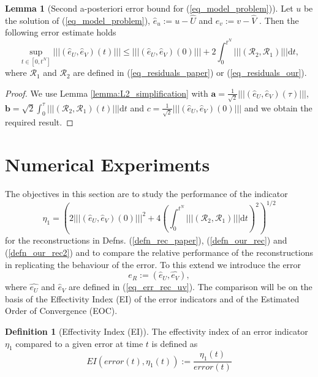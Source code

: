 \documentclass[12pt,a4paper]{article}
\numberwithin{equation}{section}
\theoremstyle{definition}
\newcommand{\pnorm}[1]{\left|\left|\left|#1\right|\right|\right|}
\newcommand{\vect}[1]{\textbf{#1}}
\newcommand{\qp}[1]{\left(#1\right)}
\newcommand{\qb}[1]{\left[#1\right]}
\newcommand{\rec}[1]{\widehat{{#1}}}
\newtheorem{Defn}[subsection]{Definition}
\newtheorem{Lemma}[subsection]{Lemma}
\begin{document}
\begin{Lemma}[Second a-posteriori error bound for (\ref{eq_model_problem})]
	Let $u$ be the solution of (\ref{eq_model_problem}), $\hat{e}_u:=u-\rec{U}$ and $\hat{e}_v:=v-\rec{V}$ .  Then the following error estimate holds
	\begin{equation}\label{eq_bound_2}
	\sup_{t\in\qb{0,t^N}}\pnorm{\qp{\hat{e}_U,\hat{e}_V}\qp{t}}\leq
	\pnorm{\qp{\hat{e}_U,\hat{e}_V}\qp{0}}+
	2{\int_0^{t^N}\pnorm{\qp{\mathcal{R}_2,\mathcal{R}_1}}\mathrm{d}t},
	\end{equation}
	where $\mathcal{R}_1$ and $\mathcal{R}_2$ are defined in (\ref{eq_residuals_paper}) or (\ref{eq_residuals_our}).
\end{Lemma}
\begin{proof}
We use  Lemma  \ref{lemma:L2_simplification} with $\vect{a}=\frac{1}{\sqrt{2}}\pnorm{\qp{\hat{e}_U, \hat{e}_V}\qp{\tau}}$, $\vect{b}=\sqrt{2}\int_0^\tau\pnorm{\qp{\mathcal{R}_2,\mathcal{R}_1}\qp{t}} \mathrm{d}t$ and $c = \frac{1}{\sqrt{2}}\pnorm{\qp{\hat{e}_U, \hat{e}_V}\qp{0}}$ and we obtain the required result.
\end{proof}



\section{Numerical Experiments}\label{sec_num_exp}
The objectives in this section are to study the performance of the indicator 
\begin{equation}\label{eq_bound_test}
\eta_1=\qp{2\pnorm{\qp{\hat{e}_U,\hat{e}_V}\qp{0}}^2+
	4\qp{\int_0^{t^N}\pnorm{\qp{\mathcal{R}_2,\mathcal{R}_1}}\mathrm{d}t}^2}^{1/2}
\end{equation}
for the reconstructions in Defns. (\ref{defn_rec_paper}), (\ref{defn_our_rec}) and (\ref{defn_our_rec2}) and to compare the relative performance of the reconstructions in replicating the behaviour of the error.  To this extend we introduce the error
\begin{equation}\label{eq_error_eR}
e_R :=\qp{\hat{e}_U,\hat{e_V}},
\end{equation}
where $\hat{e_U}$ and $\hat{e}_V$ are defined in (\ref{eq_err_rec_uv}).  
The comparison will be on the basis of the Effectivity Index (EI) of the error indicators and of the Estimated Order of Convergence (EOC).
\begin{Defn}[Effectivity Index (EI)] The effectivity index of an error indicator $\eta_1$ compared to a given error at time $t$ is defined as
\begin{equation}\label{eq_EI}
EI\qp{error\qp{t}, \eta_1\qp{t}} := \frac{\eta_1\qp{t}}{error\qp{t}}
\end{equation}
\end{Defn}
\end{document}
